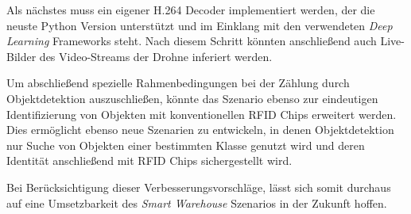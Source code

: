 Als nächstes muss ein eigener H.264 Decoder implementiert werden, der die neuste Python Version unterstützt und im Einklang mit den verwendeten \textit{Deep Learning} Frameworks steht. Nach diesem Schritt könnten anschließend auch Live-Bilder des Video-Streams der Drohne inferiert werden.

Um abschließend spezielle Rahmenbedingungen bei der Zählung durch Objektdetektion auszuschließen, könnte das Szenario ebenso zur eindeutigen Identifizierung von Objekten mit konventionellen RFID Chips erweitert werden. Dies ermöglicht ebenso neue Szenarien zu entwickeln, in denen Objektdetektion nur Suche von Objekten einer bestimmten Klasse genutzt wird und deren Identität anschließend mit RFID Chips sichergestellt wird. 

Bei Berücksichtigung dieser Verbesserungsvorschläge, lässt sich somit durchaus auf eine Umsetzbarkeit des \textit{Smart Warehouse} Szenarios in der Zukunft hoffen.
